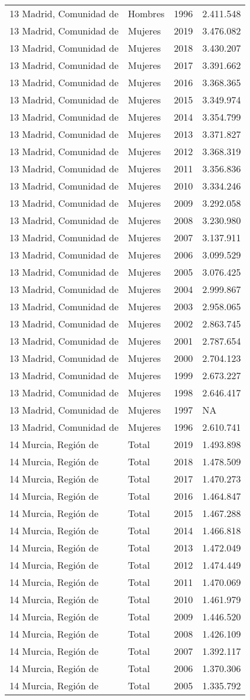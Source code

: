 \documentclass[
]{article}
\begin{document}
\begin{longtable}[]{@{}llrl@{}}
13 Madrid, Comunidad de & Hombres & 1996 & 2.411.548\tabularnewline
13 Madrid, Comunidad de & Mujeres & 2019 & 3.476.082\tabularnewline
13 Madrid, Comunidad de & Mujeres & 2018 & 3.430.207\tabularnewline
13 Madrid, Comunidad de & Mujeres & 2017 & 3.391.662\tabularnewline
13 Madrid, Comunidad de & Mujeres & 2016 & 3.368.365\tabularnewline
13 Madrid, Comunidad de & Mujeres & 2015 & 3.349.974\tabularnewline
13 Madrid, Comunidad de & Mujeres & 2014 & 3.354.799\tabularnewline
13 Madrid, Comunidad de & Mujeres & 2013 & 3.371.827\tabularnewline
13 Madrid, Comunidad de & Mujeres & 2012 & 3.368.319\tabularnewline
13 Madrid, Comunidad de & Mujeres & 2011 & 3.356.836\tabularnewline
13 Madrid, Comunidad de & Mujeres & 2010 & 3.334.246\tabularnewline
13 Madrid, Comunidad de & Mujeres & 2009 & 3.292.058\tabularnewline
13 Madrid, Comunidad de & Mujeres & 2008 & 3.230.980\tabularnewline
13 Madrid, Comunidad de & Mujeres & 2007 & 3.137.911\tabularnewline
13 Madrid, Comunidad de & Mujeres & 2006 & 3.099.529\tabularnewline
13 Madrid, Comunidad de & Mujeres & 2005 & 3.076.425\tabularnewline
13 Madrid, Comunidad de & Mujeres & 2004 & 2.999.867\tabularnewline
13 Madrid, Comunidad de & Mujeres & 2003 & 2.958.065\tabularnewline
13 Madrid, Comunidad de & Mujeres & 2002 & 2.863.745\tabularnewline
13 Madrid, Comunidad de & Mujeres & 2001 & 2.787.654\tabularnewline
13 Madrid, Comunidad de & Mujeres & 2000 & 2.704.123\tabularnewline
13 Madrid, Comunidad de & Mujeres & 1999 & 2.673.227\tabularnewline
13 Madrid, Comunidad de & Mujeres & 1998 & 2.646.417\tabularnewline
13 Madrid, Comunidad de & Mujeres & 1997 & NA\tabularnewline
13 Madrid, Comunidad de & Mujeres & 1996 & 2.610.741\tabularnewline
14 Murcia, Región de & Total & 2019 & 1.493.898\tabularnewline
14 Murcia, Región de & Total & 2018 & 1.478.509\tabularnewline
14 Murcia, Región de & Total & 2017 & 1.470.273\tabularnewline
14 Murcia, Región de & Total & 2016 & 1.464.847\tabularnewline
14 Murcia, Región de & Total & 2015 & 1.467.288\tabularnewline
14 Murcia, Región de & Total & 2014 & 1.466.818\tabularnewline
14 Murcia, Región de & Total & 2013 & 1.472.049\tabularnewline
14 Murcia, Región de & Total & 2012 & 1.474.449\tabularnewline
14 Murcia, Región de & Total & 2011 & 1.470.069\tabularnewline
14 Murcia, Región de & Total & 2010 & 1.461.979\tabularnewline
14 Murcia, Región de & Total & 2009 & 1.446.520\tabularnewline
14 Murcia, Región de & Total & 2008 & 1.426.109\tabularnewline
14 Murcia, Región de & Total & 2007 & 1.392.117\tabularnewline
14 Murcia, Región de & Total & 2006 & 1.370.306\tabularnewline
14 Murcia, Región de & Total & 2005 & 1.335.792\tabularnewline

\end{longtable}
\end{document}
